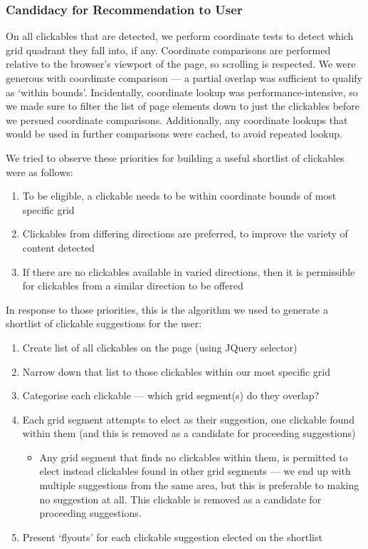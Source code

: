 \documentclass[a4paper, 12pt]{report}
\begin{document}
\subsubsection{Candidacy for Recommendation to User}
On all clickables that are detected, we perform coordinate tests to detect which grid quadrant they fall into, if any. Coordinate comparisons are performed relative to the browser's viewport of the page, so scrolling is respected. We were generous with coordinate comparison --- a partial overlap was sufficient to qualify as `within bounds'. Incidentally, coordinate lookup was performance-intensive, so we made sure to filter the list of page elements down to just the clickables before we persued coordinate comparisons. Additionally, any coordinate lookups that would be used in further comparisons were cached, to avoid repeated lookup.

We tried to observe these priorities for building a useful shortlist of clickables were as follows:

\begin{enumerate}
\item To be eligible, a clickable needs to be within coordinate bounds of most specific grid
\item Clickables from differing directions are preferred, to improve the variety of content detected
\item If there are no clickables available in varied directions, then it is permissible for clickables from a similar direction to be offered
\end{enumerate}

In response to those priorities, this is the algorithm we used to generate a shortlist of clickable suggestions for the user:
\begin{enumerate}
\item Create list of all clickables on the page (using JQuery selector)
\item Narrow down that list to those clickables within our most specific grid
\item Categorise each clickable --- which grid segment(s) do they overlap?
\item Each grid segment attempts to elect as their suggestion, one clickable found within them (and this is removed as a candidate for proceeding suggestions)
	\begin{itemize}
		\item Any grid segment that finds no clickables within them, is permitted to elect instead clickables found in other grid segments --- we end up with multiple suggestions from the same area, but this is preferable to making no suggestion at all. This clickable is removed as a candidate for proceeding suggestions.
	\end{itemize}
\item Present `flyouts' for each clickable suggestion elected on the shortlist
\end{enumerate}
\end{document}
